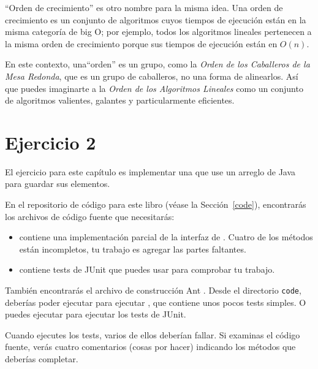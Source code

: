 \documentclass[12pt]{book}
\theoremstyle{exercise}
\begin{document}
``Orden de crecimiento'' es otro nombre para la misma idea. Una orden de
crecimiento es un conjunto de algoritmos cuyos tiempos de ejecución están
en la misma categoría de big O; por ejemplo, todos los algoritmos lineales
pertenecen a la misma orden de crecimiento porque sus tiempos de ejecución
están en $O(n)$.


En este contexto, una``orden'' es un grupo, como la \emph{Orden de
los Caballeros de la Mesa Redonda}, que es un grupo de caballeros, no una forma
de alinearlos. Así que puedes imaginarte a la \emph{Orden de los Algoritmos
Lineales} como un conjunto de algoritmos valientes, galantes y particularmente eficientes.


\section{Ejercicio 2}
\label{exercise2}

El ejercicio para este capítulo es implementar una  que
use un arreglo de Java para guardar sus elementos. 

En el repositorio de código para este libro (véase la Sección~\ref{code}),
encontrarás los archivos de código fuente que necesitarás:


\begin{itemize}
\item {} contiene una implementación parcial de la interfaz de
 . Cuatro de los métodos están incompletos, tu trabajo es agregar las partes faltantes.

\item {} contiene tests de JUnit que puedes usar para comprobar tu trabajo.

\end{itemize}

También encontrarás el archivo de construcción Ant .  Desde el
directorio {\tt code}, deberías poder ejecutar  para
ejecutar , que contiene unos pocos tests simples. O puedes
ejecutar  para ejecutar los tests de JUnit.


Cuando ejecutes los tests, varios de ellos deberían fallar. Si examinas el
código fuente, verás cuatro comentarios  (cosas por hacer)
indicando los métodos que deberías completar.
\end{document}
